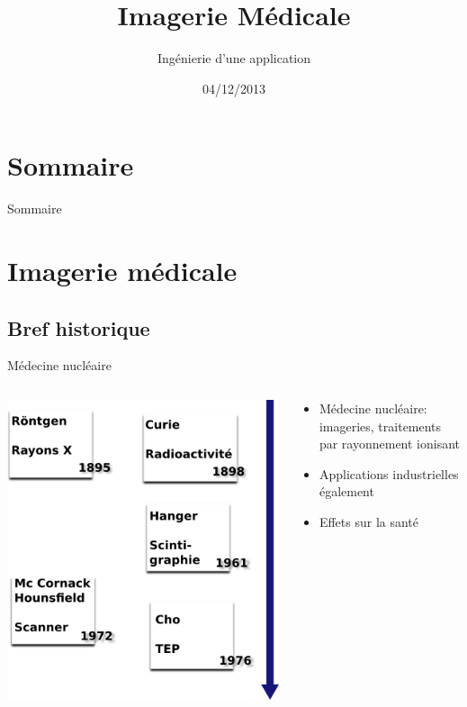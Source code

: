 \documentclass{beamer}
\title{Imagerie Médicale}
\subtitle{Ingénierie d'une application}
\date{04/12/2013}
\begin{document}
\frame{\titlepage}

\section*{Sommaire}
\begin{frame}{Sommaire}
  \tableofcontents[hideallsubsections]
\end{frame}

\section{Imagerie médicale}
\subsection{Bref historique}
\begin{frame}{Médecine nucléaire}
\begin{columns}[T]
 \begin{column}{0.5\textwidth}
 \centering
\includegraphics[height=0.7\textheight]{images/historique_radio.png}
 \end{column}
 \begin{column}{0.5\textwidth}
\begin{itemize}
 \item Médecine nucléaire: imageries, traitements par rayonnement ionisant
 \item Applications industrielles également
 \item Effets sur la santé
\end{itemize}
 \end{column}
\end{columns}
\end{frame}
\end{document}
